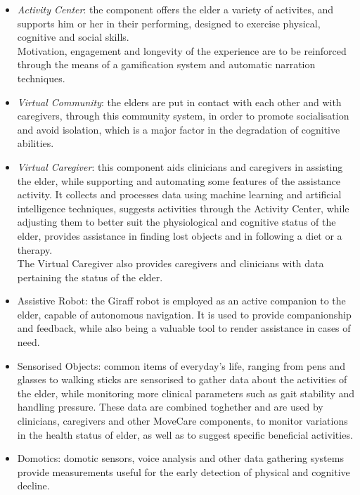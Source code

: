 \documentclass[12pt,a4paper,oneside]{report}
\begin{document}
\begin{itemize}\setlength{\itemsep}{8pt}
\item \textit{Activity Center}: the component offers the elder a variety of activites, and supports him or her in their performing, designed to exercise physical, cognitive and social skills.\\
Motivation, engagement and longevity of the experience are to be reinforced through the means of a gamification system and automatic narration techniques.
\item \textit{Virtual Community}: the elders are put in contact with each other and with caregivers, through this community system, in order to promote socialisation and avoid isolation, which is a major factor in the degradation of cognitive abilities.
\item \textit{Virtual Caregiver}: this component aids clinicians and caregivers in assisting the elder, while supporting and automating some features of the assistance activity. It collects and processes data using machine learning and artificial intelligence techniques, suggests activities through the Activity Center, while adjusting them to better suit the physiological and cognitive status of the elder, provides assistance in finding lost objects and in following a diet or a therapy.\\
The Virtual Caregiver also provides caregivers and clinicians with data pertaining the status of the elder.
\item Assistive Robot: the Giraff \cite{giraff} robot is employed as an active companion to the elder, capable of autonomous navigation. It is used to provide companionship and feedback, while also being a valuable tool to render assistance in cases of need.
\item Sensorised Objects: common items of everyday's life, ranging from pens and glasses to walking sticks are sensorised to gather data about the activities of the elder, while monitoring more clinical parameters such as gait stability and handling pressure. These data are combined toghether and are used by clinicians, caregivers and other MoveCare components, to monitor variations in the health status of elder, as well as to suggest specific beneficial activities.
\item Domotics: domotic sensors, voice analysis and other data gathering systems provide measurements useful for the early detection of physical and cognitive decline. 
\end{itemize}
\end{document}
